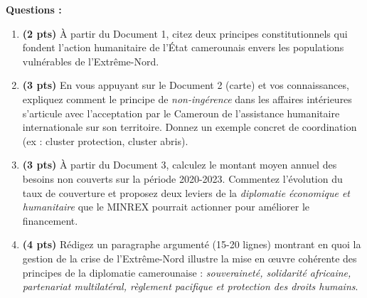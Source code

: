 \documentclass[11pt]{article}
\begin{document}
\begin{exercice}
\textbf{Questions :}
\begin{enumerate}
    \item \textbf{(2 pts)} À partir du Document 1, citez deux principes constitutionnels qui fondent l'action humanitaire de l'État camerounais envers les populations vulnérables de l'Extrême-Nord.
    \item \textbf{(3 pts)} En vous appuyant sur le Document 2 (carte) et vos connaissances, expliquez comment le principe de \emph{non-ingérence} dans les affaires intérieures s'articule avec l'acceptation par le Cameroun de l'assistance humanitaire internationale sur son territoire. Donnez un exemple concret de coordination (ex : cluster protection, cluster abris).
    \item \textbf{(3 pts)} À partir du Document 3, calculez le montant moyen annuel des besoins non couverts sur la période 2020-2023. Commentez l'évolution du taux de couverture et proposez deux leviers de la \emph{diplomatie économique et humanitaire} que le MINREX pourrait actionner pour améliorer le financement.
    \item \textbf{(4 pts)} Rédigez un paragraphe argumenté (15-20 lignes) montrant en quoi la gestion de la crise de l'Extrême-Nord illustre la mise en œuvre cohérente des principes de la diplomatie camerounaise : \emph{souveraineté, solidarité africaine, partenariat multilatéral, règlement pacifique et protection des droits humains}.
\end{enumerate}
\end{exercice}
\end{document}
